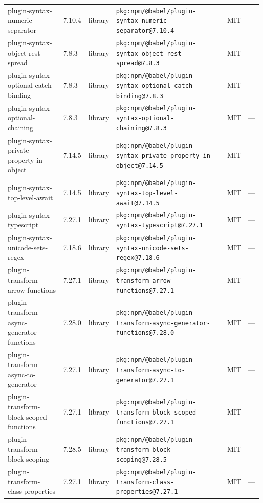 \documentclass[11pt,a4paper]{article}
\begin{document}
\begin{longtable}{|p{4cm}|p{2cm}|p{1.6cm}|p{5cm}|p{1.5cm}|p{3.5cm}|}
\raggedright plugin-syntax-numeric-separator & 7.10.4 & library & \small\texttt{pkg:npm/@babel/plugin-syntax-numeric-separator@7.10.4} & MIT & \small — \\
\raggedright plugin-syntax-object-rest-spread & 7.8.3 & library & \small\texttt{pkg:npm/@babel/plugin-syntax-object-rest-spread@7.8.3} & MIT & \small — \\
\raggedright plugin-syntax-optional-catch-binding & 7.8.3 & library & \small\texttt{pkg:npm/@babel/plugin-syntax-optional-catch-binding@7.8.3} & MIT & \small — \\
\raggedright plugin-syntax-optional-chaining & 7.8.3 & library & \small\texttt{pkg:npm/@babel/plugin-syntax-optional-chaining@7.8.3} & MIT & \small — \\
\raggedright plugin-syntax-private-property-in-object & 7.14.5 & library & \small\texttt{pkg:npm/@babel/plugin-syntax-private-property-in-object@7.14.5} & MIT & \small — \\
\raggedright plugin-syntax-top-level-await & 7.14.5 & library & \small\texttt{pkg:npm/@babel/plugin-syntax-top-level-await@7.14.5} & MIT & \small — \\
\raggedright plugin-syntax-typescript & 7.27.1 & library & \small\texttt{pkg:npm/@babel/plugin-syntax-typescript@7.27.1} & MIT & \small — \\
\raggedright plugin-syntax-unicode-sets-regex & 7.18.6 & library & \small\texttt{pkg:npm/@babel/plugin-syntax-unicode-sets-regex@7.18.6} & MIT & \small — \\
\raggedright plugin-transform-arrow-functions & 7.27.1 & library & \small\texttt{pkg:npm/@babel/plugin-transform-arrow-functions@7.27.1} & MIT & \small — \\
\raggedright plugin-transform-async-generator-functions & 7.28.0 & library & \small\texttt{pkg:npm/@babel/plugin-transform-async-generator-functions@7.28.0} & MIT & \small — \\
\raggedright plugin-transform-async-to-generator & 7.27.1 & library & \small\texttt{pkg:npm/@babel/plugin-transform-async-to-generator@7.27.1} & MIT & \small — \\
\raggedright plugin-transform-block-scoped-functions & 7.27.1 & library & \small\texttt{pkg:npm/@babel/plugin-transform-block-scoped-functions@7.27.1} & MIT & \small — \\
\raggedright plugin-transform-block-scoping & 7.28.5 & library & \small\texttt{pkg:npm/@babel/plugin-transform-block-scoping@7.28.5} & MIT & \small — \\
\raggedright plugin-transform-class-properties & 7.27.1 & library & \small\texttt{pkg:npm/@babel/plugin-transform-class-properties@7.27.1} & MIT & \small — \\

\end{longtable}
\end{document}
